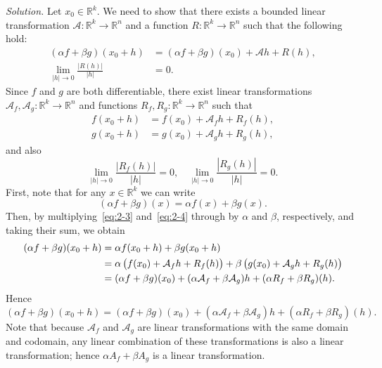 \documentclass{article}
\newcommand{\A}{\mathcal{A}}
\newcommand{\0}{\mathbf{0}}
\newcommand{\R}{\mathbb{R}}
\begin{document}
\textit{Solution.}
Let $x_0 \in \R^k$. We need to show that there exists a bounded linear
transformation $\A: \R^k \to \R^n$ and a function $R: \R^k \to \R^n$
such that the following hold:
%
\begin{align}
    (\alpha f + \beta g)(x_0 + h)
        &=
        (\alpha f + \beta g)(x_0)
        + \A h
        + R(h),
    \label{eq:2-1}
    \\
    \lim_{|h| \to 0} \frac{|R(h)|}{|h|} &= 0.
    \label{eq:2-2}
\end{align}
%
Since $f$ and $g$ are both differentiable, there exist linear
transformations $\A_f, \A_g: \R^k \to \R^n$ and functions $R_f, R_g:
\R^k \to \R^n$ such that
%
\begin{align}
    f(x_0 + h) &= f(x_0) + \A_f h + R_f(h), \label{eq:2-3} \\
    g(x_0 + h) &= g(x_0) + \A_g h + R_g(h), \label{eq:2-4}
\end{align}
%
and also
%
\begin{equation*}
    \lim_{|h| \to 0} \frac{|R_f(h)|}{|h|} = 0, \quad
    \lim_{|h| \to 0} \frac{|R_g(h)|}{|h|} = 0.
\end{equation*}
%
First, note that for any $x \in \R^k$ we can write
%
\begin{equation*}
    (\alpha f + \beta g)(x) = \alpha f(x) + \beta g(x)
    .
\end{equation*}
%
Then, by multiplying~\eqref{eq:2-3} and~\eqref{eq:2-4} through by
$\alpha$ and $\beta$, respectively, and taking their sum, we obtain
%
\begin{align*}
    (\alpha f + \beta g)(x_0 + h)
        &= \alpha f(x_0 + h) + \beta g(x_0 + h) \\
        &= \alpha \del{f(x_0) + \A_f h + R_f(h)}
            + \beta \del{g(x_0) + \A_g h + R_g(h)} \\
        &= (\alpha f + \beta g)(x_0)
            + (\alpha \A_f + \beta \A_g) h
            + (\alpha R_f + \beta R_g)(h).
\end{align*}
%
Hence
%
\begin{equation}
    (\alpha f + \beta g)(x_0 + h)
        = (\alpha f + \beta g)(x_0)
            + (\alpha \A_f + \beta \A_g) h
            + (\alpha R_f + \beta R_g)(h).
        \label{eq:2-5}
\end{equation}
%
Note that because $\A_f$ and $\A_g$ are linear transformations with the
same domain and codomain, any linear combination of these
transformations is also a linear transformation; hence $\alpha A_f +
\beta A_g$ is a linear transformation.
\end{document}
